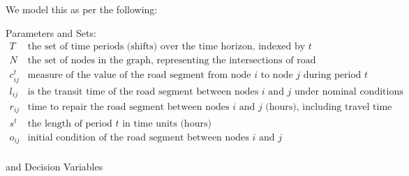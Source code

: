 \documentclass{article}
\begin{document}
	We model this as per the following:
	
	Parameters and Sets:
	\begin{displaymath}
	\begin{array}{ll}
	T & \mbox{the set of time periods (shifts) over the time horizon, indexed by $t$}\\
	N & \mbox{the set of nodes in the graph, representing the intersections of road segments}\\
	c_{ij}^t & \mbox{measure of the value of the road segment from node $i$ to node $j$ during period $t$}\\
	l_{ij} & \mbox{is the transit time of the road segment between nodes $i$ and $j$ under nominal conditions}\\
	r_{ij} & \mbox{time to repair the road segment between nodes $i$ and $j$ (hours), including travel time}\\
	s^t & \mbox{the length of period $t$ in time units (hours)}\\
	o_{ij} & \mbox{initial condition of the road segment between nodes $i$ and $j$}\\
	\end{array}
	\end{displaymath}
	
	and Decision Variables
	
\end{document}
